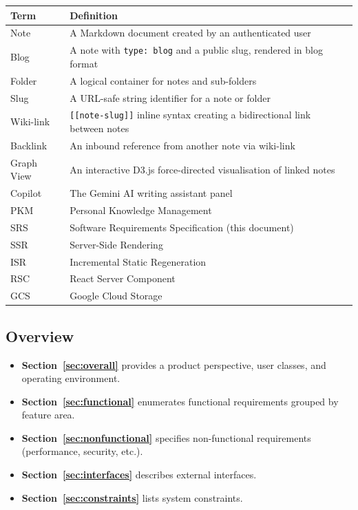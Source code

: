 \documentclass[12pt, a4paper]{article}
\begin{document}
\begin{longtable}{@{}L{3.2cm} L{10cm}@{}}
  \toprule
  \textbf{Term}       & \textbf{Definition} \\
  \midrule\endhead
  \bottomrule\endfoot
  Note       & A Markdown document created by an authenticated user \\
  Blog       & A note with \texttt{type: blog} and a public slug, rendered
               in blog format \\
  Folder     & A logical container for notes and sub-folders \\
  Slug       & A URL-safe string identifier for a note or folder \\
  Wiki-link  & \texttt{[[note-slug]]} inline syntax creating a bidirectional
               link between notes \\
  Backlink   & An inbound reference from another note via wiki-link \\
  Graph View & An interactive D3.js force-directed visualisation of linked
               notes \\
  Copilot    & The Gemini AI writing assistant panel \\
  PKM        & Personal Knowledge Management \\
  SRS        & Software Requirements Specification (this document) \\
  SSR        & Server-Side Rendering \\
  ISR        & Incremental Static Regeneration \\
  RSC        & React Server Component \\
  GCS        & Google Cloud Storage \\
\end{longtable}

\subsection{Overview}

\begin{itemize}[leftmargin=2em]
  \item \textbf{Section~\ref{sec:overall}} provides a product perspective,
        user classes, and operating environment.
  \item \textbf{Section~\ref{sec:functional}} enumerates functional requirements
        grouped by feature area.
  \item \textbf{Section~\ref{sec:nonfunctional}} specifies non-functional
        requirements (performance, security, etc.).
  \item \textbf{Section~\ref{sec:interfaces}} describes external interfaces.
  \item \textbf{Section~\ref{sec:constraints}} lists system constraints.
\end{itemize}
\end{document}
